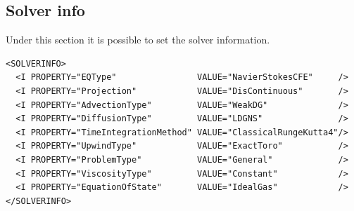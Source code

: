 \subsection*{Solver info}
Under this section it is possible to set the solver information.
\begin{lstlisting}[style=XmlStyle]
<SOLVERINFO>
  <I PROPERTY="EQType"                VALUE="NavierStokesCFE"     />
  <I PROPERTY="Projection"            VALUE="DisContinuous"       />
  <I PROPERTY="AdvectionType"         VALUE="WeakDG"              />
  <I PROPERTY="DiffusionType"         VALUE="LDGNS"               />
  <I PROPERTY="TimeIntegrationMethod" VALUE="ClassicalRungeKutta4"/>
  <I PROPERTY="UpwindType"            VALUE="ExactToro"           />
  <I PROPERTY="ProblemType"           VALUE="General"             />
  <I PROPERTY="ViscosityType"         VALUE="Constant"            />
  <I PROPERTY="EquationOfState"       VALUE="IdealGas"            />
</SOLVERINFO>
\end{lstlisting}
